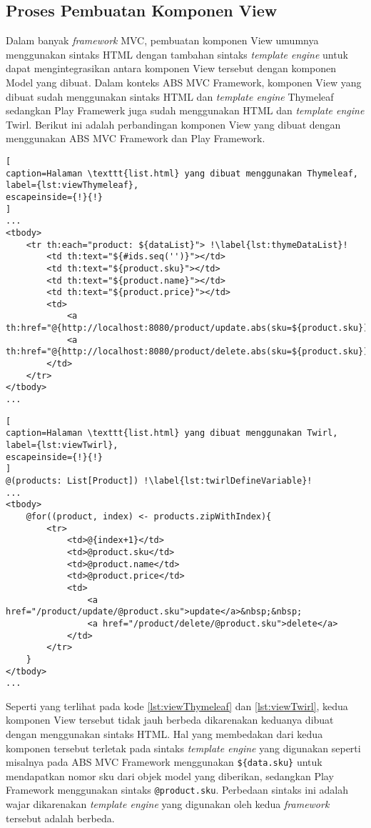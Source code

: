 \subsection{Proses Pembuatan Komponen View}

Dalam banyak \textit{framework} MVC, pembuatan komponen View umumnya menggunakan sintaks HTML dengan tambahan sintaks \textit{template engine} untuk dapat mengintegrasikan antara komponen View tersebut dengan komponen Model yang dibuat. Dalam konteks ABS MVC Framework, komponen View yang dibuat sudah menggunakan sintaks HTML dan \textit{template engine} Thymeleaf sedangkan Play Framewerk juga sudah menggunakan HTML dan \textit{template engine} Twirl. Berikut ini adalah perbandingan komponen View yang dibuat dengan menggunakan ABS MVC Framework dan Play Framework.

\begin{lstlisting}[
caption=Halaman \texttt{list.html} yang dibuat menggunakan Thymeleaf,
label={lst:viewThymeleaf},
escapeinside={!}{!}
]
...
<tbody>
	<tr th:each="product: ${dataList}"> !\label{lst:thymeDataList}!
		<td th:text="${#ids.seq('')}"></td>
		<td th:text="${product.sku}"></td>
		<td th:text="${product.name}"></td>
		<td th:text="${product.price}"></td>
		<td>
			<a th:href="@{http://localhost:8080/product/update.abs(sku=${product.sku})}">update</a>&nbsp;&nbsp;
			<a th:href="@{http://localhost:8080/product/delete.abs(sku=${product.sku})}">delete</a>
		</td>
	</tr>
</tbody>
...
\end{lstlisting}

\begin{lstlisting}[
caption=Halaman \texttt{list.html} yang dibuat menggunakan Twirl,
label={lst:viewTwirl},
escapeinside={!}{!}
]
@(products: List[Product]) !\label{lst:twirlDefineVariable}!
...
<tbody>
	@for((product, index) <- products.zipWithIndex){
		<tr>
			<td>@{index+1}</td>
			<td>@product.sku</td>
			<td>@product.name</td>
			<td>@product.price</td>
			<td>
				<a href="/product/update/@product.sku">update</a>&nbsp;&nbsp;
				<a href="/product/delete/@product.sku">delete</a>
			</td>
		</tr>
	}
</tbody>
...
\end{lstlisting}

Seperti yang terlihat pada kode \ref{lst:viewThymeleaf} dan \ref{lst:viewTwirl}, kedua komponen View tersebut tidak jauh berbeda dikarenakan keduanya dibuat dengan menggunakan sintaks HTML. Hal yang membedakan dari kedua komponen tersebut terletak pada sintaks \textit{template engine} yang digunakan seperti misalnya pada ABS MVC Framework menggunakan \texttt{\$\{data.sku\}} untuk mendapatkan nomor sku dari objek model yang diberikan, sedangkan Play Framework menggunakan sintaks \texttt{@product.sku}. Perbedaan sintaks ini adalah wajar dikarenakan \textit{template engine} yang digunakan oleh kedua \textit{framework} tersebut adalah berbeda.\\

